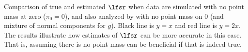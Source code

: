 \label{fig:lfsr-nn} Comparison of true and estimated $\lfsr$ when data are simulated with no point mass at zero ($\pi_0=0$), and also analyzed by \ashr with no point mass on 0 (and mixture of normal components for $g$). Black line is $y=x$ and red line is $y=2x$. The results illustrate how estimates of $\lfsr$ can be more accurate in this case. That is, assuming there is no point mass can be beneficial if that is indeed true.